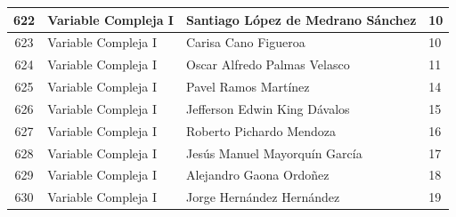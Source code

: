 {\begin{longtable}{|c|p{6.5cm}|p{5cm}|p{1.5cm}|}
  622 & Variable Compleja I & Santiago López de Medrano Sánchez & 10 \\ \hline
  623 & Variable Compleja I & Carisa Cano Figueroa & 10 \\ \hline
  624 & Variable Compleja I & Oscar Alfredo Palmas Velasco & 11 \\ \hline
  625 & Variable Compleja I & Pavel Ramos Martínez & 14 \\ \hline
  626 & Variable Compleja I & Jefferson Edwin King Dávalos & 15 \\ \hline
  627 & Variable Compleja I & Roberto Pichardo Mendoza & 16 \\ \hline
  628 & Variable Compleja I & Jesús Manuel Mayorquín García & 17 \\ \hline
  629 & Variable Compleja I & Alejandro Gaona Ordoñez & 18 \\ \hline
  630 & Variable Compleja I & Jorge Hernández Hernández & 19 \\ \hline
\end{longtable}}







\renewcommand\lstlistingname{Código} %
\renewcommand\lstlistlistingname{Códigos} %

